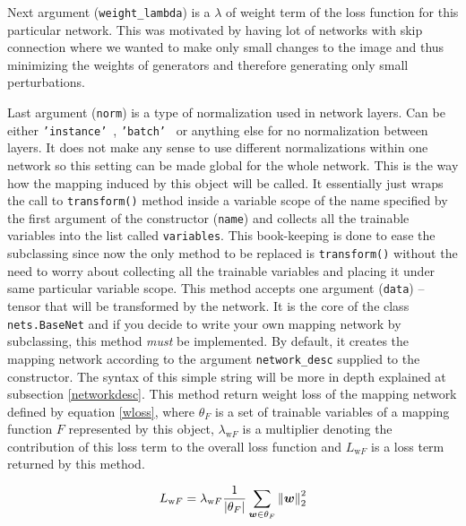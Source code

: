 \begin{itemize}
\begin{description}
Next argument (\texttt{weight\_lambda}) is a $\lambda$ of weight term of the loss function for this particular network. This was motivated by having lot of networks with skip connection where we wanted to make only small changes to the image and thus minimizing the weights of generators and therefore generating only small perturbations.

Last argument (\texttt{norm}) is a type of normalization used in network layers. Can be either \texttt{'instance'}~\cite{instancenorm}, \texttt{'batch'}~\cite{batchnorm} or anything else for no normalization between layers. It does not make any sense to use different normalizations within one network so this setting can be made global for the whole network.
 This is the way how the mapping induced by this object will be called. It essentially just wraps the call to \texttt{transform()} method inside a variable scope of the name specified by the first argument of the constructor (\texttt{name}) and collects all the trainable variables into the list called \texttt{variables}. This book-keeping is done to ease the subclassing since now the only method to be replaced is \texttt{transform()} without the need to worry about collecting all the trainable variables and placing it under same particular variable scope.
 This method accepts one argument (\texttt{data}) -- tensor that will be transformed by the network. It is the core of the class \texttt{nets.BaseNet} and if you decide to write your own mapping network by subclassing, this method {\em must} be implemented. By default, it creates the mapping network according to the argument \texttt{network\_desc} supplied to the constructor. The syntax of this simple string will be more in depth explained at subsection \ref{networkdesc}.
 This method return weight loss of the mapping network defined by equation \ref{wloss}, where $\theta_F$ is a set of trainable variables of a mapping function $F$ represented by this object, $\lambda_{\text{w}F}$ is a multiplier denoting the contribution of this loss term to the overall loss function and $L_{\text{w}F}$ is a loss term returned by this method.

\begin{equation}
L_{\text{w}F} = \lambda_{\text{w}F} \frac{1}{|\theta_F|} \sum_{\bm{w} \in \theta_F} \left\lVert\bm{w}\right\rVert_2^2
\label{wloss}
\end{equation}

\end{description}


\end{itemize}
